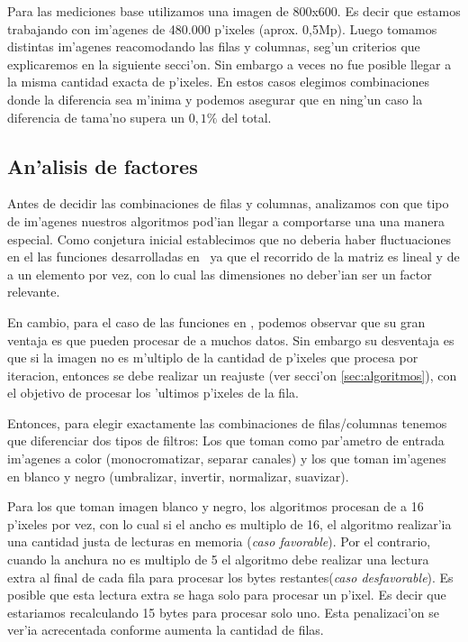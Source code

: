 Para las mediciones base utilizamos una imagen de 800x600. Es decir que estamos trabajando con im'agenes de 480.000 p'ixeles (aprox. 0,5Mp). Luego tomamos distintas im'agenes reacomodando las filas y columnas, seg'un criterios que explicaremos en la siguiente secci'on. Sin embargo a veces no fue posible llegar a la misma cantidad exacta de p'ixeles. En estos casos elegimos combinaciones donde la diferencia sea m'inima y podemos asegurar que en ning'un caso la diferencia de tama'no supera un $0,1\%$ del total.

\subsection{An'alisis de factores}
Antes de decidir las combinaciones de filas y columnas, analizamos con que tipo de im'agenes nuestros algoritmos pod'ian
llegar a comportarse una una manera especial. Como conjetura inicial establecimos que no deberia haber 
fluctuaciones en el las funciones desarrolladas en \C \ ya que el recorrido de la matriz es lineal y
de a un elemento por vez, con lo cual las dimensiones no deber'ian ser un factor relevante. 

En cambio, para el caso de las funciones en \ass, podemos observar que su gran ventaja es que pueden procesar de a muchos datos. Sin embargo su desventaja es que si la imagen no es m'ultiplo de la cantidad de p'ixeles que procesa por iteracion, entonces se debe realizar un reajuste (ver secci'on \ref{sec:algoritmos}), con el objetivo de procesar los 'ultimos p'ixeles de la fila.

Entonces, para elegir exactamente las combinaciones de filas/columnas tenemos que diferenciar dos tipos de
filtros: Los que toman como par'ametro de entrada im'agenes a color (monocromatizar, separar canales) y los que toman im'agenes en blanco y negro
(umbralizar, invertir, normalizar, suavizar).

Para los que toman imagen blanco y negro, los algoritmos procesan de a 16 p'ixeles por vez, con lo cual si el ancho es multiplo de 16, el algoritmo realizar'ia una cantidad justa de lecturas en memoria (\textit{caso favorable}). Por el contrario, cuando la anchura no es multiplo de 5 el algoritmo debe realizar una lectura extra al final de cada fila para procesar los bytes restantes(\textit{caso desfavorable}). Es posible que esta lectura extra se haga solo para procesar un p'ixel. Es decir que estariamos recalculando 15 bytes para procesar solo uno. Esta penalizaci'on se ver'ia acrecentada conforme aumenta la cantidad de filas.

